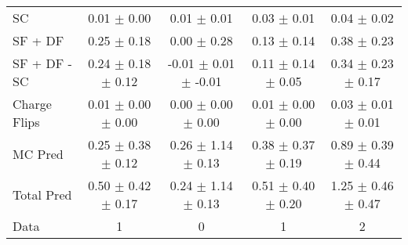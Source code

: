\begin{tabular}{l|cccc}
                                 SC &  0.01 $\pm$  0.00 &  0.01 $\pm$  0.01 &  0.03 $\pm$  0.01 &  0.04 $\pm$  0.02 \\
                            SF + DF &  0.25 $\pm$  0.18 &  0.00 $\pm$  0.28 &  0.13 $\pm$  0.14 &  0.38 $\pm$  0.23 \\
\hline
                       SF + DF - SC &  0.24 $\pm$  0.18 $\pm$  0.12 & -0.01 $\pm$  0.01 $\pm$ -0.01 &  0.11 $\pm$  0.14 $\pm$  0.05 &  0.34 $\pm$  0.23 $\pm$  0.17 \\
\hline\hline
                       Charge Flips &  0.01 $\pm$  0.00 $\pm$  0.00 &  0.00 $\pm$  0.00 $\pm$  0.00 &  0.01 $\pm$  0.00 $\pm$  0.00 &  0.03 $\pm$  0.01 $\pm$  0.01 \\
\hline
                            MC Pred &  0.25 $\pm$  0.38 $\pm$  0.12 &  0.26 $\pm$  1.14 $\pm$  0.13 &  0.38 $\pm$  0.37 $\pm$  0.19 &  0.89 $\pm$  0.39 $\pm$  0.44 \\
\hline
                         Total Pred &  0.50 $\pm$  0.42 $\pm$  0.17 &  0.24 $\pm$  1.14 $\pm$  0.13 &  0.51 $\pm$  0.40 $\pm$  0.20 &  1.25 $\pm$  0.46 $\pm$  0.47 \\
\hline\hline
                               Data &     1 &     0 &     1 &     2 \\
\hline\hline
\end{tabular}

